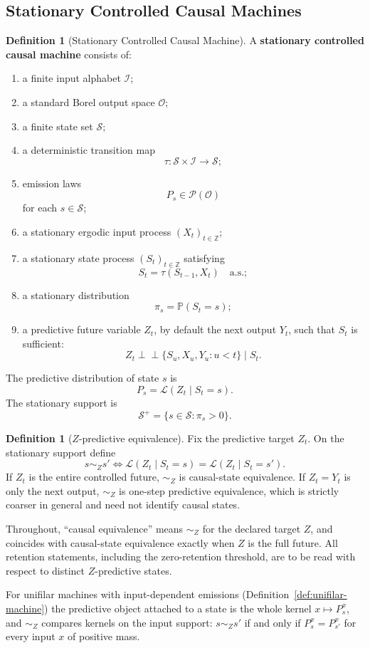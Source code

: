 \documentclass[12pt]{article}
\theoremstyle{definition}
\newtheorem{definition}[theorem]{Definition}
\newcommand{\Splus}{\mathcal S^{+}}
\begin{document}
\subsection{Stationary Controlled Causal Machines}
\label{subsec:controlled-markov}

\begin{definition}[Stationary Controlled Causal Machine]
\label{def:controlled-markov}
A \textbf{stationary controlled causal machine} consists of:
\begin{enumerate}[label=(\arabic*)]
\item a finite input alphabet $\mathcal I$;
\item a standard Borel output space $\mathcal O$;
\item a finite state set $\mathcal S$;
\item a deterministic transition map
\[
\tau:\mathcal S\times\mathcal I\to\mathcal S;
\]
\item emission laws
\[
P_s\in\mathcal P(\mathcal O)
\]
for each $s\in\mathcal S$;
\item a stationary ergodic input process $(X_t)_{t\in\mathbb Z}$;
\item a stationary state process $(S_t)_{t\in\mathbb Z}$ satisfying
\[
S_t=\tau(S_{t-1},X_t)
\quad\text{a.s.};
\]
\item a stationary distribution
\[
\pi_s=\mathbb P(S_t=s);
\]
\item a predictive future variable $Z_t$, by default the next output $Y_t$,
such that $S_t$ is sufficient:
\[
Z_t\perp\!\!\!\perp
\{S_u,X_u,Y_u:u<t\}
\mid S_t.
\]
\end{enumerate}
The predictive distribution of state $s$ is
\[
P_s=\mathcal L(Z_t\mid S_t=s).
\]
The stationary support is
\[
\Splus=\{s\in\mathcal S:\pi_s>0\}.
\]
\end{definition}

\begin{definition}[$Z$-predictive equivalence]
\label{def:z-predictive-equivalence}
Fix the predictive target $Z_t$.  On the stationary support define
\[
s\sim_Z s'
\iff
\mathcal L(Z_t\mid S_t=s)
=
\mathcal L(Z_t\mid S_t=s').
\]
If $Z_t$ is the entire controlled future, $\sim_Z$ is causal-state
equivalence.  If $Z_t=Y_t$ is only the next output, $\sim_Z$ is one-step
predictive equivalence, which is strictly coarser in general and need not
identify causal states.

Throughout, ``causal equivalence'' means $\sim_Z$ for the declared target
$Z$, and coincides with causal-state equivalence exactly when $Z$ is the full
future.  All retention statements, including the zero-retention threshold,
are to be read with respect to distinct $Z$-predictive states.

For unifilar machines with input-dependent emissions
(Definition~\ref{def:unifilar-machine}) the predictive object attached to a
state is the whole kernel $x\mapsto P_s^x$, and $\sim_Z$ compares kernels on
the input support: $s\sim_Zs'$ if and only if $P_s^x=P_{s'}^x$ for every input
$x$ of positive mass.
\end{definition}
\end{document}

